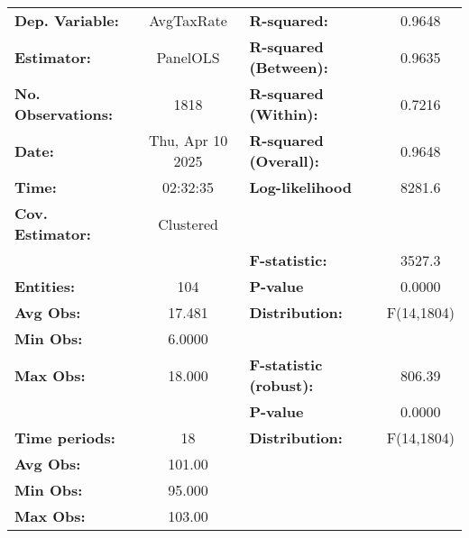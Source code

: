 \begin{center}
\begin{tabular}{lclc}
\toprule
\textbf{Dep. Variable:}                    &     AvgTaxRate     & \textbf{  R-squared:         }   &      0.9648      \\
\textbf{Estimator:}                        &      PanelOLS      & \textbf{  R-squared (Between):}  &      0.9635      \\
\textbf{No. Observations:}                 &        1818        & \textbf{  R-squared (Within):}   &      0.7216      \\
\textbf{Date:}                             &  Thu, Apr 10 2025  & \textbf{  R-squared (Overall):}  &      0.9648      \\
\textbf{Time:}                             &      02:32:35      & \textbf{  Log-likelihood     }   &      8281.6      \\
\textbf{Cov. Estimator:}                   &     Clustered      & \textbf{                     }   &                  \\
\textbf{}                                  &                    & \textbf{  F-statistic:       }   &      3527.3      \\
\textbf{Entities:}                         &        104         & \textbf{  P-value            }   &      0.0000      \\
\textbf{Avg Obs:}                          &       17.481       & \textbf{  Distribution:      }   &    F(14,1804)    \\
\textbf{Min Obs:}                          &       6.0000       & \textbf{                     }   &                  \\
\textbf{Max Obs:}                          &       18.000       & \textbf{  F-statistic (robust):} &      806.39      \\
\textbf{}                                  &                    & \textbf{  P-value            }   &      0.0000      \\
\textbf{Time periods:}                     &         18         & \textbf{  Distribution:      }   &    F(14,1804)    \\
\textbf{Avg Obs:}                          &       101.00       & \textbf{                     }   &                  \\
\textbf{Min Obs:}                          &       95.000       & \textbf{                     }   &                  \\
\textbf{Max Obs:}                          &       103.00       & \textbf{                     }   &                  \\

\end{tabular}
\end{center}
